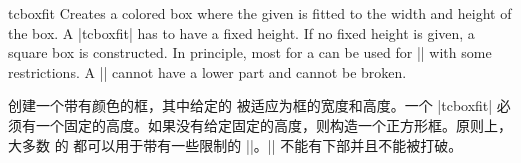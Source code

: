 \begin{docCommand}{tcboxfit}{}
Creates a colored box where the given  is fitted to
the width and height of the box. A |tcboxfit| has to have a fixed height.
If no fixed height is given, a square box is constructed.
In principle, most  for a 
can be used for |\tcboxfit| with some restrictions. A |\tcboxfit| cannot have
a lower part and cannot be broken.

创建一个带有颜色的框，其中给定的  被适应为框的宽度和高度。一个 |tcboxfit| 必须有一个固定的高度。如果没有给定固定的高度，则构造一个正方形框。原则上，大多数  的  都可以用于带有一些限制的 |\tcboxfit|。|\tcboxfit| 不能有下部并且不能被打破。
\begin{dispExample}
\begin{tcbraster}[raster columns=3,raster valign=bottom]
\end{tcbraster}
\begin{tcbraster}[colback=green!10!white,boxsep=1mm]
\end{tcbraster}
\end{dispExample}
\end{docCommand}

